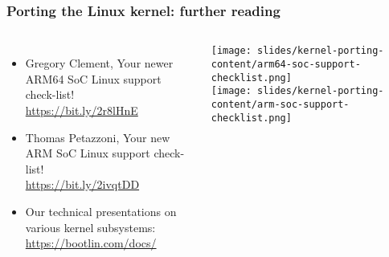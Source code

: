 \begin{frame}
  \frametitle{Porting the Linux kernel: further reading}
  \begin{columns}
    \begin{itemize}
    \item Gregory Clement, Your newer ARM64 SoC Linux support check-list!\\
          \url{https://bit.ly/2r8lHnE}
    \item Thomas Petazzoni, Your new ARM SoC Linux support check-list!\\
          \url{https://bit.ly/2ivqtDD}
    \item Our technical presentations on various kernel subsystems:\\
          \url{https://bootlin.com/docs/}
    \end{itemize}
    \texttt{[image: slides/kernel-porting-content/arm64-soc-support-checklist.png]}\\
    \texttt{[image: slides/kernel-porting-content/arm-soc-support-checklist.png]}
  \end{columns}
\end{frame}
